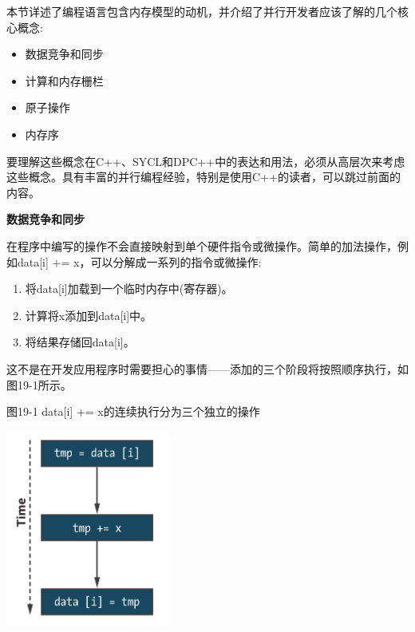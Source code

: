 本节详述了编程语言包含内存模型的动机，并介绍了并行开发者应该了解的几个核心概念:\par

\begin{itemize}
	\item 数据竞争和同步
	\item 计算和内存栅栏
	\item 原子操作
	\item 内存序
\end{itemize}

要理解这些概念在C++、SYCL和DPC++中的表达和用法，必须从高层次来考虑这些概念。具有丰富的并行编程经验，特别是使用C++的读者，可以跳过前面的内容。\par

\hspace*{\fill} \par %
\textbf{数据竞争和同步}

在程序中编写的操作不会直接映射到单个硬件指令或微操作。简单的加法操作，例如data[i] += x，可以分解成一系列的指令或微操作:\par

\begin{enumerate}
	\item 将data[i]加载到一个临时内存中(寄存器)。
	\item 计算将x添加到data[i]中。
	\item 将结果存储回data[i]。
\end{enumerate}

这不是在开发应用程序时需要担心的事情——添加的三个阶段将按照顺序执行，如图19-1所示。\par

\hspace*{\fill} \par %
图19-1 data[i] += x的连续执行分为三个独立的操作
\begin{center}
	\includegraphics[width=0.4\textwidth]{content/chapter-19/images/2}
\end{center}

